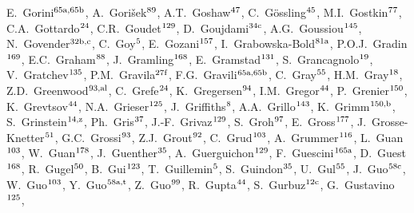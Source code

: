 \begin{flushleft}
E.~Gorini$^\textrm{\scriptsize 65a,65b}$,    
A.~Gori\v{s}ek$^\textrm{\scriptsize 89}$,    
A.T.~Goshaw$^\textrm{\scriptsize 47}$,    
C.~G\"ossling$^\textrm{\scriptsize 45}$,    
M.I.~Gostkin$^\textrm{\scriptsize 77}$,    
C.A.~Gottardo$^\textrm{\scriptsize 24}$,    
C.R.~Goudet$^\textrm{\scriptsize 129}$,    
D.~Goujdami$^\textrm{\scriptsize 34c}$,    
A.G.~Goussiou$^\textrm{\scriptsize 145}$,    
N.~Govender$^\textrm{\scriptsize 32b,c}$,    
C.~Goy$^\textrm{\scriptsize 5}$,    
E.~Gozani$^\textrm{\scriptsize 157}$,    
I.~Grabowska-Bold$^\textrm{\scriptsize 81a}$,    
P.O.J.~Gradin$^\textrm{\scriptsize 169}$,    
E.C.~Graham$^\textrm{\scriptsize 88}$,    
J.~Gramling$^\textrm{\scriptsize 168}$,    
E.~Gramstad$^\textrm{\scriptsize 131}$,    
S.~Grancagnolo$^\textrm{\scriptsize 19}$,    
V.~Gratchev$^\textrm{\scriptsize 135}$,    
P.M.~Gravila$^\textrm{\scriptsize 27f}$,    
F.G.~Gravili$^\textrm{\scriptsize 65a,65b}$,    
C.~Gray$^\textrm{\scriptsize 55}$,    
H.M.~Gray$^\textrm{\scriptsize 18}$,    
Z.D.~Greenwood$^\textrm{\scriptsize 93,al}$,    
C.~Grefe$^\textrm{\scriptsize 24}$,    
K.~Gregersen$^\textrm{\scriptsize 94}$,    
I.M.~Gregor$^\textrm{\scriptsize 44}$,    
P.~Grenier$^\textrm{\scriptsize 150}$,    
K.~Grevtsov$^\textrm{\scriptsize 44}$,    
N.A.~Grieser$^\textrm{\scriptsize 125}$,    
J.~Griffiths$^\textrm{\scriptsize 8}$,    
A.A.~Grillo$^\textrm{\scriptsize 143}$,    
K.~Grimm$^\textrm{\scriptsize 150,b}$,    
S.~Grinstein$^\textrm{\scriptsize 14,z}$,    
Ph.~Gris$^\textrm{\scriptsize 37}$,    
J.-F.~Grivaz$^\textrm{\scriptsize 129}$,    
S.~Groh$^\textrm{\scriptsize 97}$,    
E.~Gross$^\textrm{\scriptsize 177}$,    
J.~Grosse-Knetter$^\textrm{\scriptsize 51}$,    
G.C.~Grossi$^\textrm{\scriptsize 93}$,    
Z.J.~Grout$^\textrm{\scriptsize 92}$,    
C.~Grud$^\textrm{\scriptsize 103}$,    
A.~Grummer$^\textrm{\scriptsize 116}$,    
L.~Guan$^\textrm{\scriptsize 103}$,    
W.~Guan$^\textrm{\scriptsize 178}$,    
J.~Guenther$^\textrm{\scriptsize 35}$,    
A.~Guerguichon$^\textrm{\scriptsize 129}$,    
F.~Guescini$^\textrm{\scriptsize 165a}$,    
D.~Guest$^\textrm{\scriptsize 168}$,    
R.~Gugel$^\textrm{\scriptsize 50}$,    
B.~Gui$^\textrm{\scriptsize 123}$,    
T.~Guillemin$^\textrm{\scriptsize 5}$,    
S.~Guindon$^\textrm{\scriptsize 35}$,    
U.~Gul$^\textrm{\scriptsize 55}$,    
J.~Guo$^\textrm{\scriptsize 58c}$,    
W.~Guo$^\textrm{\scriptsize 103}$,    
Y.~Guo$^\textrm{\scriptsize 58a,t}$,    
Z.~Guo$^\textrm{\scriptsize 99}$,    
R.~Gupta$^\textrm{\scriptsize 44}$,    
S.~Gurbuz$^\textrm{\scriptsize 12c}$,    
G.~Gustavino$^\textrm{\scriptsize 125}$,    

\end{flushleft}
